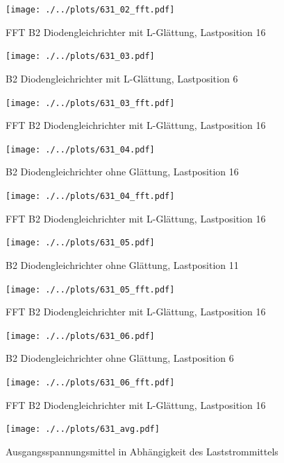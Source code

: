 \begin{figure}[h!]
    \centering
    \texttt{[image: ./../plots/631\_02\_fft.pdf]}
    \caption{FFT B2 Diodengleichrichter mit L-Glättung, Lastposition 16}
\end{figure}


\begin{figure}[h!]
    \centering
    \texttt{[image: ./../plots/631\_03.pdf]}
    \caption{B2 Diodengleichrichter mit L-Glättung, Lastposition 6}
\end{figure}

\begin{figure}[h!]
    \centering
    \texttt{[image: ./../plots/631\_03\_fft.pdf]}
    \caption{FFT B2 Diodengleichrichter mit L-Glättung, Lastposition 16}
\end{figure}


\begin{figure}[h!]
    \centering
    \texttt{[image: ./../plots/631\_04.pdf]}
    \caption{B2 Diodengleichrichter ohne Glättung, Lastposition 16}
\end{figure}

\begin{figure}[h!]
    \centering
    \texttt{[image: ./../plots/631\_04\_fft.pdf]}
    \caption{FFT B2 Diodengleichrichter mit L-Glättung, Lastposition 16}
\end{figure}


\begin{figure}[h!]
    \centering
    \texttt{[image: ./../plots/631\_05.pdf]}
    \caption{B2 Diodengleichrichter ohne Glättung, Lastposition 11}
\end{figure}

\begin{figure}[h!]
    \centering
    \texttt{[image: ./../plots/631\_05\_fft.pdf]}
    \caption{FFT B2 Diodengleichrichter mit L-Glättung, Lastposition 16}
\end{figure}


\begin{figure}[h!]
    \centering
    \texttt{[image: ./../plots/631\_06.pdf]}
    \caption{B2 Diodengleichrichter ohne Glättung, Lastposition 6}
\end{figure}

\begin{figure}[h!]
    \centering
    \texttt{[image: ./../plots/631\_06\_fft.pdf]}
    \caption{FFT B2 Diodengleichrichter mit L-Glättung, Lastposition 16}
\end{figure}

\begin{figure}[h!]
    \centering
    \texttt{[image: ./../plots/631\_avg.pdf]}
    \caption{Ausgangsspannungsmittel in Abhängigkeit des Laststrommittels}
\end{figure}




\clearpage
